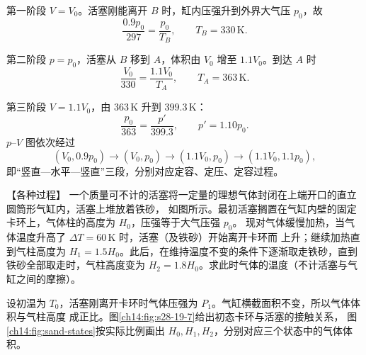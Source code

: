 {\begin{xesolution}
\heatedCylinderDiagram

第一阶段 $V=V_0$。活塞刚能离开 $B$ 时，缸内压强升到外界大气压 $p_0$，故
\begin{equation}
  \frac{0.9p_0}{297}=\frac{p_0}{T_B},\qquad
  \boxed{T_B=330\,\mathrm K}.
\end{equation}

第二阶段 $p=p_0$，活塞从 $B$ 移到 $A$，体积由 $V_0$ 增至 $1.1V_0$。到达 $A$ 时
\begin{equation}
  \frac{V_0}{330}=\frac{1.1V_0}{T_A},\qquad
  T_A=363\,\mathrm K.
\end{equation}

第三阶段 $V=1.1V_0$，由 $363\,\mathrm K$ 升到 $399.3\,\mathrm K$：
\begin{equation}
  \frac{p_0}{363}=\frac{p'}{399.3},\qquad
  \boxed{p'=1.10p_0}.
\end{equation}
$p$--$V$ 图依次经过
\begin{equation}
  (V_0,0.9p_0)\longrightarrow(V_0,p_0)
  \longrightarrow(1.1V_0,p_0)\longrightarrow(1.1V_0,1.1p_0),
\end{equation}
即“竖直—水平—竖直”三段，分别对应定容、定压、定容过程。
\end{xesolution}

\begin{origexamplebox}{【各种过程】}\label{ch14:ex:s28-19-7}
一个质量可不计的活塞将一定量的理想气体封闭在上端开口的直立圆筒形气缸内，活塞上堆放着铁砂，
如图所示。最初活塞搁置在气缸内壁的固定卡环上，气体柱的高度为 $H_0$，压强等于大气压强 $p_0$。
现对气体缓慢加热，当气体温度升高了 $\Delta T=60\,\mathrm K$ 时，活塞（及铁砂）开始离开卡环而
上升；继续加热直到气柱高度为 $H_1=1.5H_0$。此后，在维持温度不变的条件下逐渐取走铁砂，直到
铁砂全部取走时，气柱高度变为 $H_2=1.8H_0$。求此时气体的温度（不计活塞与气缸之间的摩擦）。
\figureNineteenSevenFaithful
\end{origexamplebox}

\begin{xesolution}
设初温为 $T_0$，活塞刚离开卡环时气体压强为 $P_1$。气缸横截面积不变，所以气体体积与气柱高度
成正比。图\ref{ch14:fig:s28-19-7}给出初态卡环与活塞的接触关系，
图\ref{ch14:fig:sand-states}按实际比例画出 $H_0,H_1,H_2$，分别对应三个状态中的气体体积。

\sandPistonDiagram


\end{xesolution}}
